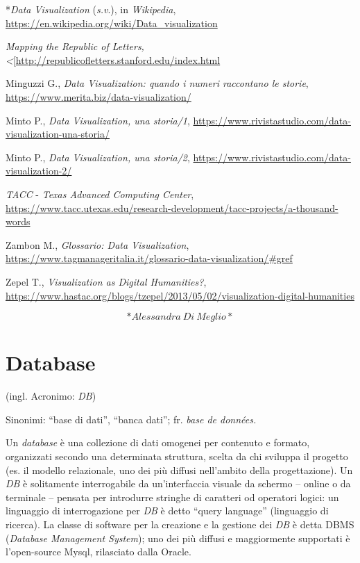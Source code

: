 \documentclass[
  b5paper,
  twoside,
  12pt,
  chapterprefix=false,
  bibliography=totocnumbered,
  parskip=false]{scrbook}
\begin{document}
*\emph{Data Visualization} (\emph{s.v}.), in \emph{Wikipedia},
\url{https://en.wikipedia.org/wiki/Data_visualization}

\emph{Mapping the Republic of Letters,
\textless{}}{[}\url{http://republicofletters.stanford.edu/index.html}

Minguzzi G., \emph{Data Visualization: quando i numeri raccontano le storie},
\url{https://www.merita.biz/data-visualization/}

Minto P., \emph{Data Visualization, una storia/1},
\url{https://www.rivistastudio.com/data-visualization-una-storia/}

Minto P., \emph{Data Visualization, una storia/2},
\url{https://www.rivistastudio.com/data-visualization-2/}

\emph{TACC} - \emph{Texas Advanced Computing Center},
\url{https://www.tacc.utexas.edu/research-development/tacc-projects/a-thousand-words}

Zambon M., \emph{Glossario: Data Visualization},
\url{https://www.tagmanageritalia.it/glossario-data-visualization/\#gref}

Zepel T., \emph{Visualization as Digital Humanities?},
\url{https://www.hastac.org/blogs/tzepel/2013/05/02/visualization-digital-humanities}

\[*Alessandra~Di~Meglio*\]

\hypertarget{database}{%
\chapter{Database}\label{database}}

(ingl. Acronimo: \emph{DB})

Sinonimi: \enquote{base di dati}, \enquote{banca dati}; fr. \emph{base de données.}

Un \emph{database} è una collezione di dati omogenei per contenuto e formato,
organizzati secondo una determinata struttura, scelta da chi sviluppa il
progetto (es. il modello relazionale, uno dei più diffusi nell'ambito
della progettazione). Un \emph{DB} è solitamente interrogabile da
un'interfaccia visuale da schermo -- online o da terminale -- pensata
per introdurre stringhe di caratteri od operatori logici: un linguaggio
di interrogazione per \emph{DB} è detto \enquote{query language} (linguaggio di
ricerca). La classe di software per la creazione e la gestione dei \emph{DB}
è detta DBMS (\emph{Database Management System}); uno dei più diffusi e
maggiormente supportati è l'open-source Mysql, rilasciato dalla Oracle.
\end{document}
